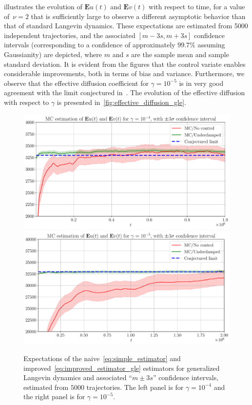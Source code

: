 \documentclass[11pt,a4paper]{article}
\newcommand{\expect}[0]{\mathbf{E}}
\theoremstyle{plain}
\numberwithin{equation}{section}
\begin{document}
 illustrates the evolution of $\expect u(t)$ and $\expect v(t)$ with respect to time,
for a value of~$\nu = 2$ that is sufficiently large to observe a different asymptotic behavior than that of standard Langevin dynamics.
These expectations are estimated from 5000 independent trajectories,
and the associated $[m - 3 s, m + 3 s]$ confidence intervals (corresponding to a confidence of approximately $99.7\%$ assuming Gaussianity) are depicted,
where $m$ and $s$ are the sample mean and sample standard deviation.
It is evident from the figures that the control variate enables considerable improvements,
both in terms of bias and variance.
Furthermore, we observe that the effective diffusion coefficient for $\gamma = 10^{-5}$
is in very good agreement with the limit conjectured in~\cite{GPGSUV21}.
The evolution of the effective diffusion with respect to $\gamma$ is presented in~\cref{fig:effective_diffusion_gle}.
\begin{figure}[ht]
    \centering
    \includegraphics[width=0.495\linewidth]{figures/time-gle-4.pdf}
    \includegraphics[width=0.495\linewidth]{figures/time-gle-5.pdf}
    \caption{%
        Expectations of the naive~\eqref{eq:simple_estimator} and improved~\eqref{eq:improved_estimator_gle} estimators for generalized Langevin dynamics
        and associated ``$m \pm 3 s$'' confidence intervals,
        estimated from $5000$ trajectories.
        The left panel is for $\gamma = 10^{-4}$ and the right panel is for $\gamma = 10^{-5}$.
    }
    \label{fig:effective_diffusion_time_gle}
\end{figure}
\end{document}

